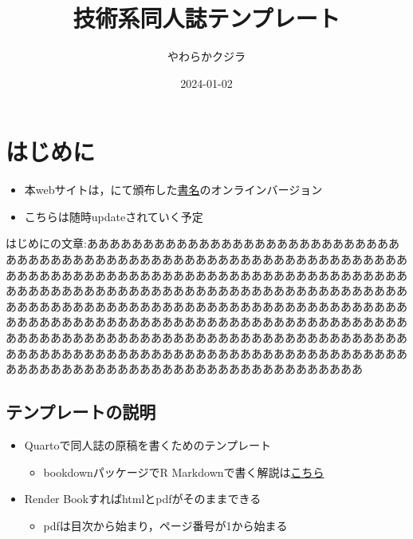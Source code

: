 \documentclass[
  b5paper,
  xelatex, ja=standard]{bxjsbook}
\title{技術系同人誌テンプレート}
\author{やわらかクジラ}
\date{2024-01-02}
\providecommand{\tightlist}{%
  \setlength{\itemsep}{0pt}\setlength{\parskip}{0pt}}\usepackage{longtable,booktabs,array}
\renewcommand*\contentsname{Table of contents}
\newcommand\contentsname{Table of contents}
\begin{document}
\maketitle

\renewcommand*\contentsname{目次}
{
\hypersetup{linkcolor=}
\setcounter{tocdepth}{2}
\tableofcontents
}

\chapter*{はじめに}\label{ux306fux3058ux3081ux306b}


\begin{itemize}
\tightlist
\item
  本webサイトは，にて頒布した\href{url}{書名}のオンラインバージョン
\item
  こちらは随時updateされていく予定
\end{itemize}

はじめにの文章:ああああああああああああああああああああああああああああああああああああああああああああああああああああああああああああああああああああああああああああああああああああああああああああああああああああああああああああああああああああああああああああああああああああああああああああああああああああああああああああああああああああああああああああああああああああああああああああああああああああああああああああああああああああああああああああああああああああああああああああああああああああああああああああああああああああああああああああああああああああああああああああああああああああああああああああああああああああああああ

\section*{テンプレートの説明}\label{ux30c6ux30f3ux30d7ux30ecux30fcux30c8ux306eux8aacux660e}


\begin{itemize}
\item
  Quartoで同人誌の原稿を書くためのテンプレート

  \begin{itemize}
  \tightlist
  \item
    bookdownパッケージでR
    Markdownで書く解説は\href{https://izunyan.github.io/dojinshi-template-rmd/}{こちら}
  \end{itemize}
\item
  Render Bookすればhtmlとpdfがそのままできる

  \begin{itemize}
  \tightlist
  \item
    pdfは目次から始まり，ページ番号が1から始まる
  \end{itemize}
\end{itemize}
\end{document}

